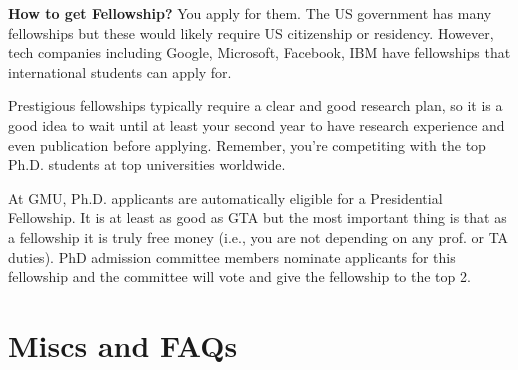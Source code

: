 \documentclass[11pt]{article}
\begin{document}
\textbf{How to get Fellowship?} You apply for them.  The US government has many fellowships but these would likely require US citizenship or residency.  However, tech companies including Google, Microsoft, Facebook, IBM have fellowships that international students can apply for. 

Prestigious fellowships typically require a clear and good research plan, so it is a good idea to wait until at least your second year to have research experience and even publication before applying. Remember, you're competiting with the top Ph.D. students at top universities worldwide. 


\begin{tcolorbox}[left=1pt,right=1pt,top=1pt,bottom=1pt]
At GMU, Ph.D. applicants are automatically eligible for a Presidential Fellowship.  It is at least as good as GTA but the most important thing is that as a fellowship it is truly free money (i.e., you are not depending on any prof. or TA duties).  PhD admission committee members nominate applicants for this fellowship and the committee will vote and give the fellowship to the top 2.
\end{tcolorbox}


\section{Miscs and FAQs}
\end{document}
